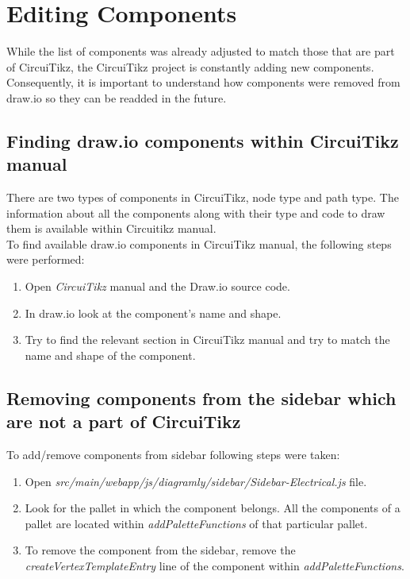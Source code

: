 %
\chapter{Editing Components}\label{ch:editing-components}

While the list of components was already adjusted to match those that are part of CircuiTikz, the CircuiTikz project is constantly adding new components.
Consequently, it is important to understand how components were removed from draw.io so they can be readded in the future.

\section{Finding draw.io components within CircuiTikz manual}\label{sec:finding-draw.io-components-within-circuitikz-manual}
There are two types of components in CircuiTikz, node type and path type.
The information about all the components along with their type and code to draw them is available within Circuitikz manual.\\
To find available draw.io components in CircuiTikz manual, the following steps were performed:
\begin{enumerate}
    \item Open \emph{CircuiTikz} manual and the Draw.io source code.
    \item In draw.io look at the component's name and shape.
    \item Try to find the relevant section in CircuiTikz manual and try to match the name and shape of the component.
\end{enumerate}

\section{Removing components from the sidebar which are not a part of CircuiTikz}\label{sec:removing-components-from-the-sidebar-which-are-not-a-part-of-circuitikz}
To add/remove components from sidebar following steps were taken:
\begin{enumerate}
    \item Open \emph{src/main/webapp/js/diagramly/sidebar/Sidebar-Electrical.js} file.
    \item Look for the pallet in which the component belongs.
        All the components of a pallet are located within \emph{addPaletteFunctions} of that particular pallet.
    \item To remove the component from the sidebar, remove the \emph{createVertexTemplateEntry} line of the component within \emph{addPaletteFunctions}.
\end{enumerate}
